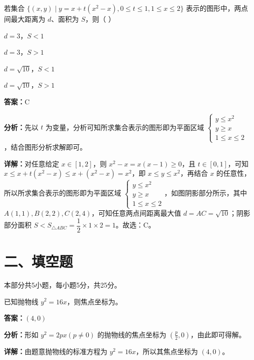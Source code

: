 \begin{question}[points=4]
若集合 $\{(x,y) \mid y = x + t(x^2 - x), 0 \leq t \leq 1, 1 \leq x \leq 2\}$ 表示的图形中，两点间最大距离为 $d$、面积为 $S$，则（ ）
\begin{choices}
  \item $d = 3$，$S < 1$
  \item $d = 3$，$S > 1$
  \item $d = \sqrt{10}$，$S < 1$
  \item $d = \sqrt{10}$，$S > 1$
\end{choices}
\begin{solution}
\textbf{答案：}C

\textbf{分析：}先以 $t$ 为变量，分析可知所求集合表示的图形即为平面区域 $\begin{cases} y \leq x^2 \\ y \geq x \\ 1 \leq x \leq 2 \end{cases}$，结合图形分析求解即可。

\textbf{详解：}对任意给定 $x \in [1,2]$，则 $x^2 - x = x(x-1) \geq 0$，且 $t \in [0,1]$，可知 $x \leq x + t(x^2 - x) \leq x + (x^2 - x) = x^2$，即 $x \leq y \leq x^2$，再结合 $x$ 的任意性，所以所求集合表示的图形即为平面区域 $\begin{cases} y \leq x^2 \\ y \geq x \\ 1 \leq x \leq 2 \end{cases}$，如图阴影部分所示，其中 $A(1,1), B(2,2), C(2,4)$，可知任意两点间距离最大值 $d = AC = \sqrt{10}$；阴影部分面积 $S < S_{\triangle ABC} = \dfrac{1}{2} \times 1 \times 2 = 1$。故选：C。
\end{solution}
\end{question}

\section*{二、填空题}
本部分共5小题，每小题5分，共25分。

\begin{question}[points=5]
已知抛物线 $y^2 = 16x$，则焦点坐标为。
\fillin[{$(4,0)$}]
\begin{solution}
\textbf{答案：}$(4,0)$

\textbf{分析：}形如 $y^2 = 2px (p \neq 0)$ 的抛物线的焦点坐标为 $(\frac{p}{2},0)$，由此即可得解。

\textbf{详解：}由题意抛物线的标准方程为 $y^2 = 16x$，所以其焦点坐标为 $(4,0)$。
\end{solution}
\end{question}

